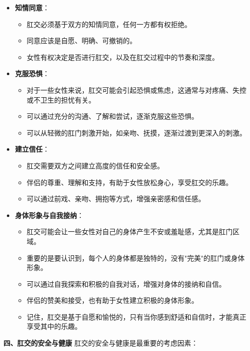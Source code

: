 \documentclass[12pt,UTF8]{ctexbook}
\begin{document}
\begin{itemize}
	\item \textbf{知情同意}：
	\begin{itemize}
		\item 肛交必须基于双方的知情同意，任何一方都有权拒绝。
		\item 同意应该是自愿、明确、可撤销的。
		\item 女性有权决定是否进行肛交，以及在肛交过程中的节奏和深度。
	\end{itemize}
	\item \textbf{克服恐惧}：
	\begin{itemize}
		\item 对于一些女性来说，肛交可能会引起恐惧或焦虑，这通常与对疼痛、失控或不卫生的担忧有关。
		\item 可以通过充分的沟通、了解和尝试，逐渐克服这些恐惧。
		\item 可以从轻微的肛门刺激开始，如亲吻、抚摸，逐渐过渡到更深入的刺激。
	\end{itemize}
	\item \textbf{建立信任}：
	\begin{itemize}
		\item 肛交需要双方之间建立高度的信任和安全感。
		\item 伴侣的尊重、理解和支持，有助于女性放松身心，享受肛交的乐趣。
		\item 可以通过前戏、亲吻、拥抱等方式，增强亲密感和信任感。
	\end{itemize}
	\item \textbf{身体形象与自我接纳}：
	\begin{itemize}
		\item 肛交可能会让一些女性对自己的身体产生不安或羞耻感，尤其是肛门区域。
		\item 重要的是要认识到，每个人的身体都是独特的，没有"完美"的肛门或身体形象。
		\item 可以通过自我探索和积极的自我对话，增强对身体的接纳和自信。
		\item 伴侣的赞美和接受，也有助于女性建立积极的身体形象。
		\item 记住，肛交是基于自愿和愉悦的，只有当你感到舒适和自信时，才能真正享受其中的乐趣。
	\end{itemize}
\end{itemize}

\textbf{四、肛交的安全与健康}
肛交的安全与健康是最重要的考虑因素：
\end{document}
